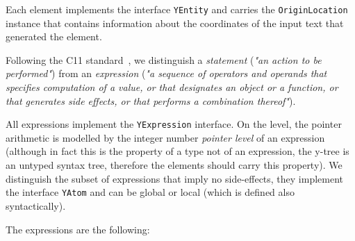 Each \ytree{} element implements the interface \texttt{YEntity} and carries the \texttt{OriginLocation} %
instance that contains information about the coordinates of the input text that generated the \ytree{} element.

Following the C11 standard~\cite{iso2012iec}, we distinguish a \textit{statement} (\textit{"an action to be performed"}) from an \textit{expression} (\textit{"a sequence of operators and operands that specifies computation of a value, or that designates an object or a function, or that generates side effects, or that performs a combination thereof"}).

All \ytree{} expressions implement the \texttt{YExpression} interface.
On the \ytree{} level, the pointer arithmetic is modelled by the integer number \textit{pointer level} of an expression (although in fact this is the property of a type not of an expression, the y-tree is an untyped syntax tree, therefore the elements \ytree{} should carry this property).
We distinguish the subset of expressions that imply no side-effects, they implement the interface \texttt{YAtom} and can be global or local (which is defined also syntactically).

\vspace{0.5em}
The \ytree{} expressions are the following:


